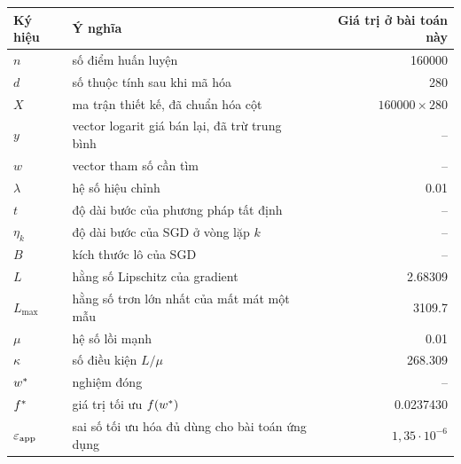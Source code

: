 \documentclass[12pt,a4paper]{report}
\begin{document}
\begin{center}
  \begin{tabular}{llr}
    \toprule
    Ký hiệu & Ý nghĩa & Giá trị ở bài toán này \\
    \midrule
    $n$          & số điểm huấn luyện                     & \num{160000} \\
    $d$          & số thuộc tính sau khi mã hóa           & 280 \\
    $X$          & ma trận thiết kế, đã chuẩn hóa cột     & $\num{160000} \times 280$ \\
    $y$          & vector logarit giá bán lại, đã trừ trung bình & -- \\
    $w$          & vector tham số cần tìm                 & -- \\
    $\lambda$    & hệ số hiệu chỉnh                       & \num{0.01} \\
    $t$          & độ dài bước của phương pháp tất định   & -- \\
    $\eta_k$     & độ dài bước của SGD ở vòng lặp $k$     & -- \\
    $B$          & kích thước lô của SGD                  & -- \\
    $L$          & hằng số Lipschitz của gradient         & \num{2.68309} \\
    $L_{\max}$   & hằng số trơn lớn nhất của mất mát một mẫu & \num{3109.7} \\
    $\mu$        & hệ số lồi mạnh                         & \num{0.01} \\
    $\kappa$     & số điều kiện $L/\mu$                   & \num{268.309} \\
    $w^{*}$     & nghiệm đóng                            & -- \\
    $f^{*}$     & giá trị tối ưu $f(w^{*})$             & \num{0.0237430} \\
    $\varepsilon_{\text{app}}$ & sai số tối ưu hóa đủ dùng cho bài toán ứng dụng & $1{,}35 \cdot 10^{-6}$ \\
    \bottomrule
  \end{tabular}
\end{center}

\newpage













\newpage

\printbibliography[heading=bibintoc,title={Tài liệu tham khảo}]
\end{document}

